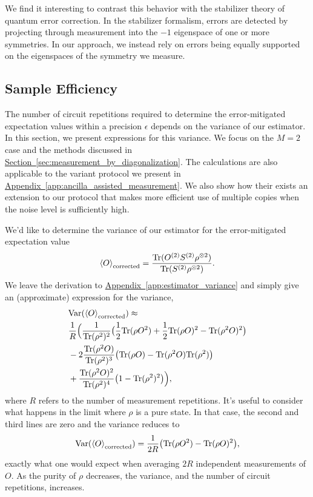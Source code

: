 \documentclass[
amsmath,
amssymb,
aps,
pra,
reprint,
twocolumn,
superscriptaddress,
longbibliography,
showkeys,
floatfix
]{revtex4-1}
\def\tr{\mathrm{Tr}}
\renewcommand{\sec}[1]{\hyperref[sec:#1]{Section~\ref*{sec:#1}}}
\newcommand{\app}[1]{\hyperref[app:#1]{Appendix~\ref*{app:#1}}}
\begin{document}
We find it interesting to contrast this behavior with the stabilizer theory of
quantum error correction. 
In the stabilizer formalism, errors are detected by projecting through measurement into the \(-1\)
eigenspace of one or more symmetries. 
In our approach, we instead rely on errors being equally supported on the
eigenspaces of the symmetry we measure.

\subsection{Sample Efficiency}
\label{sec:sample_efficiency}

The number of circuit repetitions required to determine the error-mitigated
expectation values within a precision \(\epsilon\) depends on the variance of our
estimator.
In this section, we present expressions for this variance.
We focus on the \(M=2\) case and the methods discussed in
\sec{measurement_by_diagonalization}.
The calculations are also applicable to the variant protocol we present in
\app{ancilla_assisted_measurement}.
We also show how their exists an extension to our protocol that makes more
efficient use of multiple copies when the noise level is sufficiently high.

We'd like to determine the variance of our estimator for the error-mitigated expectation value
\begin{equation}
  \label{eq:error_mitigated_ev_1}
  \ev{O}_\textrm{corrected} = \frac{\tr(O^{(2)} S^{(2)} \rho^{\otimes 2})}{\tr(S^{(2)} \rho^{\otimes 2})}.
\end{equation}
We leave the derivation to \app{estimator_variance} and
simply give an (approximate) expression for the variance,
\begin{align}
  & \textrm{Var}(\ev{O}_\textrm{corrected}) \approx \nonumber \\
  &\frac{1}{R}\Big(\frac{1}{\tr(\rho^2)^2}\big(\frac{1}{2}\tr(\rho O^2) + \frac{1}{2}\tr(\rho O)^2 - \tr(\rho^2 O)^2\big)
    \nonumber \\
  \label{eq:rho_2_estimator_variance_intro}
  &- 2 \frac{\tr(\rho^2 O)}{\tr(\rho^2)^3}\big(\tr(\rho O) - \tr(\rho^2 O)\tr(\rho^2)\big)
  \\
  &+ \frac{\tr(\rho^2 O)^2}{\tr(\rho^2)^4}\big(1 - \tr(\rho^2)^2\big)\Big),
    \nonumber
\end{align}
where \(R\) refers to the number of measurement repetitions. 
It's useful to consider what happens in the limit where \(\rho\) is a pure
state. 
In that case, the second and third lines are zero and the variance reduces to
\begin{equation}
  \textrm{Var}(\ev{O}_\textrm{corrected}) = \frac{1}{2R}\big(\tr(\rho O^2) - \tr(\rho O)^2 \big),
\end{equation}
exactly what one would expect when averaging \(2R\) independent measurements of
\(O\). 
As the purity of \(\rho\) decreases, the variance, and the number of circuit
repetitions, increases.
\end{document}
